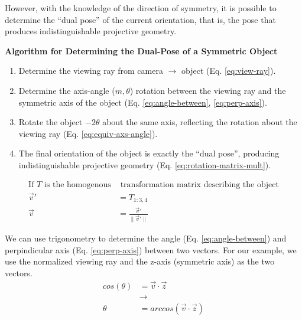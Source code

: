 However, with the knowledge of the direction of symmetry, it is possible to determine the ``dual pose'' of the current orientation, that is, the pose that produces indistinguishable projective geometry.

\begin{mdframed}
    \begin{center}
        {\bf Algorithm for Determining the Dual-Pose of a Symmetric Object}
    \end{center}
\begin{enumerate}
    \item Determine the viewing ray from camera $\rightarrow$ object (Eq. \ref{eq:view-ray}).
    \item Determine the axis-angle ($m,\theta$) rotation between the viewing ray and the symmetric axis of the object (Eq. \ref{eq:angle-between}, \ref{eq:perp-axis}).
    \item Rotate the object $-2\theta$ about the same axis, reflecting the rotation about the viewing ray (Eq. \ref{eq:equiv-axs-angle}).
    \item The final orientation of the object is exactly the ``dual pose'', producing indistinguishable projective geometry (Eq. \ref{eq:rotation-matrix-mult}).
\end{enumerate}
\end{mdframed}

\begin{equation}
    \begin{aligned}
        \text{If $T$ is the homogenous}& \text{ transformation matrix describing the object} \\
        \vec{v}' &= T_{1:3,4} \\
        \vec{v} & = \frac{\vec{v}'}{\|\vec{v}'\|}
    \end{aligned}
    \label{eq:view-ray}
\end{equation}


We can use trigonometry to determine the angle (Eq. \ref{eq:angle-between}) and perpindicular axis (Eq. \ref{eq:perp-axis}) between two vectors. For our example, we use the normalized viewing ray and the z-axis (symmetric axis) as the two vectors.
\begin{equation}
    \begin{aligned}
        cos(\theta) &= \vec{v} \cdot \vec{z} \\
        &\rightarrow \\
        \theta &= arccos(\vec{v} \cdot \vec{z})
    \end{aligned}
    \label{eq:angle-between}
\end{equation}

